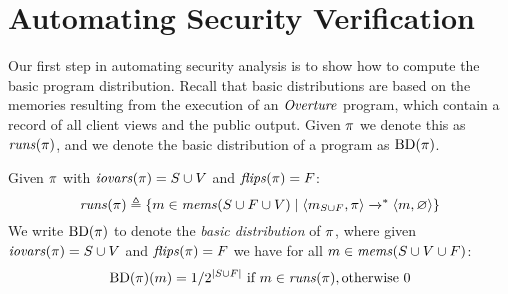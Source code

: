 \section{Automating Security Verification}
\label{section-automation}



Our first step in automating security analysis is to show how to
compute the basic program distribution. Recall that basic
distributions are based on the memories resulting from the execution of an
$\mathit{Overture}$ program, which contain a record of all client views and the
public output.  Given $\pi$ we denote this as $\mathit{runs}(\pi)$, and we
denote the basic distribution of a program as $\mathrm{BD}(\pi)$.
\begin{definition}
  Given $\pi$ with $\mathit{iovars}(\pi) = S \cup V$ and $\mathit{flips}(\pi) = F$:
  $$
  \mathit{runs}(\pi) \triangleq \{ m \in \mathit{mems}(S\cup F \cup V) \mid \langle m_{S \cup F},\pi \rangle \xrightarrow{}^{*} \langle m,\varnothing \rangle \}
  $$
  We write $\mathrm{BD}(\pi)$ to denote the \emph{basic distribution} of
  $\pi$, where given $\mathit{iovars}(\pi) = S \cup V$ and $\mathit{flips}(\pi) = F$
  we have for all $m \in \mathit{mems}(S \cup V \cup F)$:
  $$
  \mathrm{BD}(\pi)(m) =  1 / 2^{|S\cup F|} \ \text{if}\ m \in \mathit{runs}(\pi), \text{otherwise}\ 0
  $$
\end{definition}

